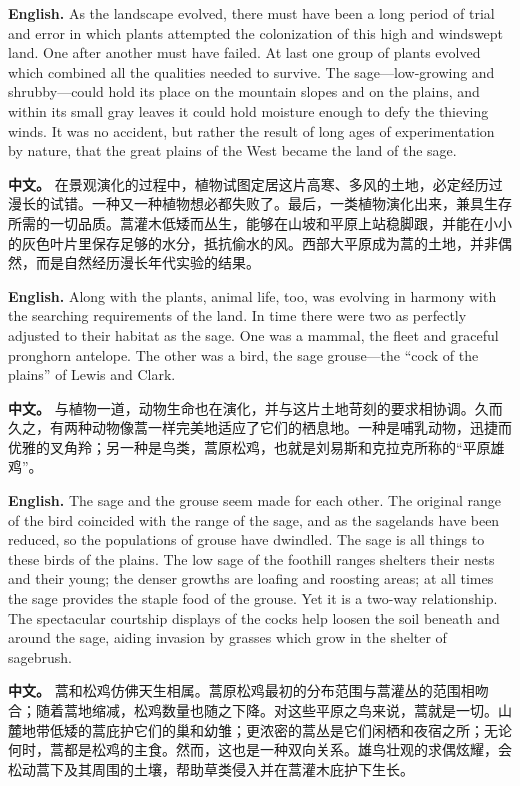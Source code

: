 \noindent\textbf{English.} As the landscape evolved, there must have been a long period of trial and error in which plants attempted the colonization of this high and windswept land. One after another must have failed. At last one group of plants evolved which combined all the qualities needed to survive. The sage---low-growing and shrubby---could hold its place on the mountain slopes and on the plains, and within its small gray leaves it could hold moisture enough to defy the thieving winds. It was no accident, but rather the result of long ages of experimentation by nature, that the great plains of the West became the land of the sage.
\par
\noindent\textbf{中文。} 在景观演化的过程中，植物试图定居这片高寒、多风的土地，必定经历过漫长的试错。一种又一种植物想必都失败了。最后，一类植物演化出来，兼具生存所需的一切品质。蒿灌木低矮而丛生，能够在山坡和平原上站稳脚跟，并能在小小的灰色叶片里保存足够的水分，抵抗偷水的风。西部大平原成为蒿的土地，并非偶然，而是自然经历漫长年代实验的结果。
\par\medskip

\noindent\textbf{English.} Along with the plants, animal life, too, was evolving in harmony with the searching requirements of the land. In time there were two as perfectly adjusted to their habitat as the sage. One was a mammal, the fleet and graceful pronghorn antelope. The other was a bird, the sage grouse---the ``cock of the plains'' of Lewis and Clark.
\par
\noindent\textbf{中文。} 与植物一道，动物生命也在演化，并与这片土地苛刻的要求相协调。久而久之，有两种动物像蒿一样完美地适应了它们的栖息地。一种是哺乳动物，迅捷而优雅的叉角羚；另一种是鸟类，蒿原松鸡，也就是刘易斯和克拉克所称的“平原雄鸡”。
\par\medskip

\noindent\textbf{English.} The sage and the grouse seem made for each other. The original range of the bird coincided with the range of the sage, and as the sagelands have been reduced, so the populations of grouse have dwindled. The sage is all things to these birds of the plains. The low sage of the foothill ranges shelters their nests and their young; the denser growths are loafing and roosting areas; at all times the sage provides the staple food of the grouse. Yet it is a two-way relationship. The spectacular courtship displays of the cocks help loosen the soil beneath and around the sage, aiding invasion by grasses which grow in the shelter of sagebrush.
\par
\noindent\textbf{中文。} 蒿和松鸡仿佛天生相属。蒿原松鸡最初的分布范围与蒿灌丛的范围相吻合；随着蒿地缩减，松鸡数量也随之下降。对这些平原之鸟来说，蒿就是一切。山麓地带低矮的蒿庇护它们的巢和幼雏；更浓密的蒿丛是它们闲栖和夜宿之所；无论何时，蒿都是松鸡的主食。然而，这也是一种双向关系。雄鸟壮观的求偶炫耀，会松动蒿下及其周围的土壤，帮助草类侵入并在蒿灌木庇护下生长。
\par\medskip

